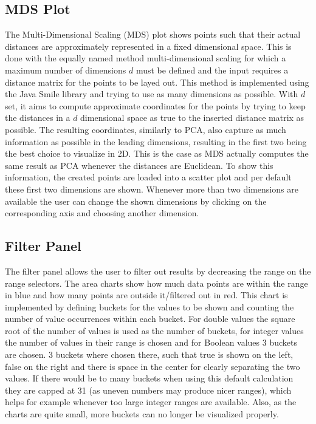 \documentclass[
	a4paper,
	english,
	twoside,
	openright,               
	11pt                            
	]{report}
\begin{document}
\subsection{MDS Plot}
The Multi-Dimensional Scaling (MDS) plot shows points such that their actual distances are approximately represented in a fixed dimensional space. This is done with the equally named method multi-dimensional scaling \cite{mds} for which a maximum number of dimensions $d$ must be defined and the input requires a distance matrix for the points to be layed out. This method is implemented using the Java Smile \cite{javasmile} library and trying to use as many dimensions as possible. With $d$ set, it aims to compute approximate coordinates for the points by trying to keep the distances in a $d$ dimensional space as true to the inserted distance matrix as possible. The resulting coordinates, similarly to PCA, also capture as much information as possible in the leading dimensions, resulting in the first two being the best choice to visualize in 2D. This is the case as MDS actually computes the same result as PCA whenever the distances are Euclidean. To show this information, the created points are loaded into a scatter plot and per default these first two dimensions are shown. Whenever more than two dimensions are available the user can change the shown dimensions by clicking on the corresponding axis and choosing another dimension. 

\subsection{Filter Panel}
The filter panel allows the user to filter out results by decreasing the range on the range selectors. The area charts show how much data points are within the range in blue and how many points are outside it/filtered out in red. This chart is implemented by defining buckets for the values to be shown and counting the number of value occurrences within each bucket. For double values the square root of the number of values is used as the number of buckets, for integer values the number of values in their range is chosen and for Boolean values 3 buckets are chosen. 3 buckets where chosen there, such that true is shown on the left, false on the right and there is space in the center for clearly separating the two values. If there would be to many buckets when using this default calculation they are capped at 31 (as uneven numbers may produce nicer ranges), which helps for example whenever too large integer ranges are available. Also, as the charts are quite small, more buckets can no longer be visualized properly.
\end{document}
